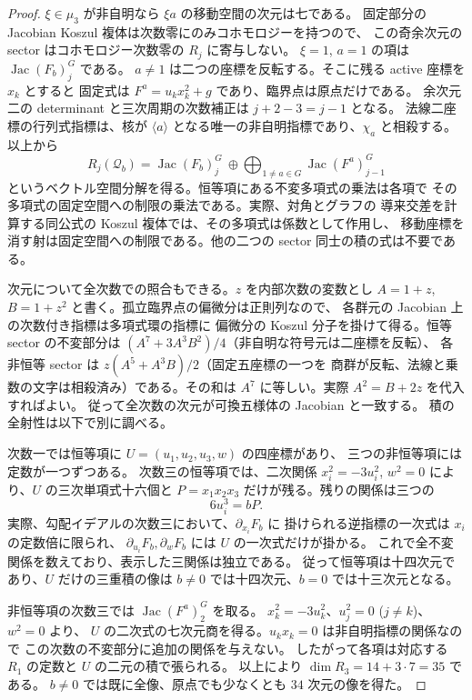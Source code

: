 \begin{proof}
$\xi\in\mu_3$ が非自明なら $\xi a$ の移動空間の次元は七である。
固定部分の Jacobian Koszul 複体は次数零にのみコホモロジーを持つので、
この奇余次元の sector はコホモロジー次数零の $R_j$ に寄与しない。
$\xi=1$, $a=1$ の項は $\operatorname{Jac}(F_b)_j^G$ である。
$a\ne1$ は二つの座標を反転する。そこに残る active 座標を $x_k$ とすると
固定式は $F^{a}=u_k x_k^2+g$ であり、臨界点は原点だけである。
余次元二の determinant と三次周期の次数補正は $j+2-3=j-1$ となる。
法線二座標の行列式指標は、核が $\langle a\rangle$ となる唯一の非自明指標であり、$\chi_a$ と相殺する。
以上から
\[
 R_j(\mathcal Q_b)=
 \operatorname{Jac}(F_b)_j^G\ \oplus \bigoplus_{1\ne a\in G}\operatorname{Jac}(F^{a})_{j-1}^G
\]
というベクトル空間分解を得る。恒等項にある不変多項式の乗法は各項で
その多項式の固定空間への制限の乗法である。実際、対角とグラフの
導来交差を計算する同公式の Koszul 複体では、その多項式は係数として作用し、
移動座標を消す射は固定空間への制限である。他の二つの sector 同士の積の式は不要である。

次元について全次数での照合もできる。$z$ を内部次数の変数とし
$A=1+z$, $B=1+z^2$ と書く。孤立臨界点の偏微分は正則列なので、
各群元の Jacobian 上の次数付き指標は多項式環の指標に
偏微分の Koszul 分子を掛けて得る。恒等 sector の不変部分は
$(A^7+3A^3B^2)/4$（非自明な符号元は二座標を反転）、
各非恒等 sector は $z(A^5+A^3B)/2$（固定五座標の一つを
商群が反転、法線と乗数の文字は相殺済み）である。その和は
$A^7$ に等しい。実際 $A^2=B+2z$ を代入すればよい。
従って全次数の次元が可換五様体の Jacobian と一致する。
積の全射性は以下で別に調べる。

次数一では恒等項に $U=(u_1,u_2,u_3,w)$ の四座標があり、
三つの非恒等項には定数が一つずつある。
次数三の恒等項では、二次関係
$x_i^2=-3u_i^2$, $w^2=0$ により、$U$ の三次単項式十六個と
$P=x_1x_2x_3$ だけが残る。残りの関係は三つの
\[
                     6u_i^3=bP .
\]
実際、勾配イデアルの次数三において、$\partial_{x_i} F_b$ に
掛けられる逆指標の一次式は $x_i$ の定数倍に限られ、
$\partial_{u_i} F_b,\partial_w F_b$ には $U$ の一次式だけが掛かる。
これで全不変関係を数えており、表示した三関係は独立である。
従って恒等項は十四次元であり、$U$ だけの三重積の像は
$b\ne0$ では十四次元、$b=0$ では十三次元となる。

非恒等項の次数三では $\operatorname{Jac}(F^a)_2^G$ を取る。
$x_k^2=-3u_k^2$、$u_j^2=0$ ($j\ne k$)、$w^2=0$ より、
$U$ の二次式の七次元商を得る。$u_k x_k=0$ は非自明指標の関係なので
この次数の不変部分に追加の関係を与えない。
したがって各項は対応する $R_1$ の定数と $U$ の二元の積で張られる。
以上により $\dim R_3=14+3\cdot7=35$ である。
$b\ne0$ では既に全像、原点でも少なくとも $34$ 次元の像を得た。


\end{proof}

